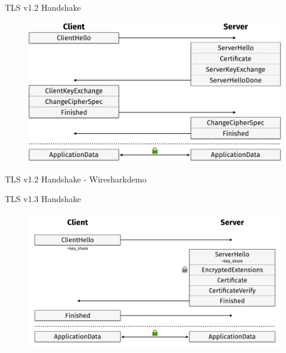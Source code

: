 \documentclass{f4_beamer_metropolis}
\begin{document}
\begin{frame}{TLS v1.2 Handshake}
  \begin{figure}[!h]
    \centering
    \includegraphics[scale=0.375,keepaspectratio]{./images/tls12-handshake-ecdhe.png}
    \label{fig:tls12-handshake-ecdhe}
    \autocite{taubert}
  \end{figure}

\end{frame}

\begin{frame}[standout]
  TLS v1.2 Handshake - Wiresharkdemo
\end{frame}

\begin{frame}{TLS v1.3 Handshake}
  \begin{figure}[!h]
    \centering
    \vspace*{-0.25cm}
    \includegraphics[width=\linewidth]{./images/tls13-handshake-ecdhe.png}
    \label{fig:tls13-handshake-ecdhe}
    \autocite{taubert}
  \end{figure}
\end{frame}
\end{document}
